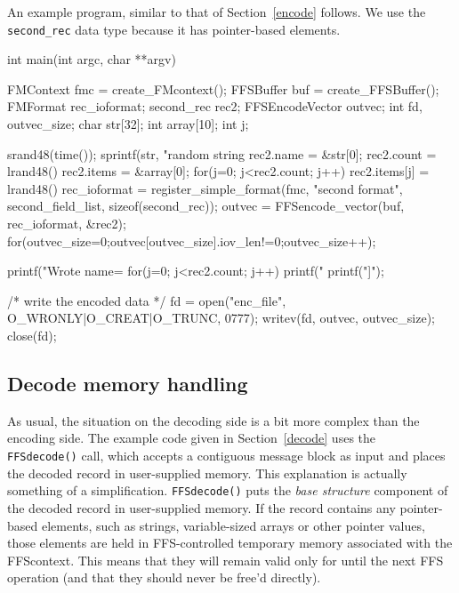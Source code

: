 An example program, similar to that of Section~\ref{encode} follows.  We use
the {\tt second\_rec} data type because it has pointer-based elements.
\begin{Code}
int main(int argc, char **argv)
{
    FMContext fmc = create_FMcontext();
    FFSBuffer buf = create_FFSBuffer();
    FMFormat rec_ioformat;
    second_rec rec2;
    FFSEncodeVector outvec;
    int fd, outvec_size;
    char str[32];
    int array[10];
    int j;

    srand48(time());
    sprintf(str, "random string %
    rec2.name = &str[0];
    rec2.count = lrand48()%
    rec2.items = &array[0];
    for(j=0; j<rec2.count; j++) rec2.items[j] = lrand48()%
    rec_ioformat = register_simple_format(fmc, "second format", second_field_list, sizeof(second_rec));
    outvec = FFSencode_vector(buf, rec_ioformat, &rec2);
    for(outvec_size=0;outvec[outvec_size].iov_len!=0;outvec_size++);

    printf("Wrote name=%
    for(j=0; j<rec2.count; j++) printf("%
    printf("]\n");

    /* write the encoded data */
    fd = open("enc_file", O_WRONLY|O_CREAT|O_TRUNC, 0777);
    writev(fd, outvec, outvec_size);
    close(fd);
}
\end{Code}
\subsection{Decode memory handling\label{mem_layout}}

As usual, the situation on the decoding side is a bit more complex than the
encoding side.  The example code given in Section~\ref{decode} uses the {\tt
  FFSdecode()} call, which accepts a contiguous message block as input and
places the decoded record in user-supplied memory.  This explanation is actually
something of a simplification.  {\tt FFSdecode()} puts the {\it base
  structure} component of the decoded record in user-supplied memory.  If
the record contains any pointer-based elements, such as strings,
variable-sized arrays or other pointer values, those elements are held in
FFS-controlled temporary memory associated with the FFScontext.  This means
that they will remain valid only for until the next FFS operation (and that
they should never be free'd directly).

